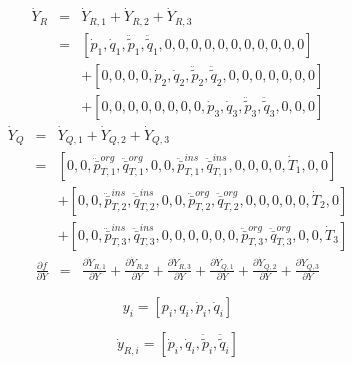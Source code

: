\documentclass[a4paper,10pt]{article}
\begin{document}
\begin{eqnarray*}
\dot{Y}_R & = & \dot{Y}_{R,1} + \dot{Y}_{R,2} + \dot{Y}_{R,3}\\
          & = & [   \dot{p}_1, \dot{q}_1, \ddot{\tilde{p}}_1, \ddot{\tilde{q}}_1, 0, 0, 0, 0, 0, 0, 0, 0, 0, 0, 0 ]\\
          &   & + [ 0, 0, 0, 0, \dot{p}_2, \dot{q}_2, \ddot{\tilde{p}}_2, \ddot{\tilde{q}}_2, 0, 0, 0, 0, 0, 0, 0 ]\\
          &   & + [ 0, 0, 0, 0, 0, 0, 0, 0, \dot{p}_3, \dot{q}_3, \ddot{\tilde{p}}_3, \ddot{\tilde{q}}_3, 0, 0, 0 ]
\end{eqnarray*}
\begin{eqnarray*}
\dot{Y}_Q & = & \dot{Y}_{Q,1} + \dot{Y}_{Q,2} + \dot{Y}_{Q,3}\\
          & = &   [ 0, 0, \ddot{\bar{p}}_{T,1}^{org}, \ddot{\bar{q}}_{T,1}^{org}, 0, 0, \ddot{\bar{p}}_{T,1}^{ins}, \ddot{\bar{q}}_{T,1}^{ins}, 0, 0, 0, 0, \dot{T}_1, 0, 0 ]\\
          &   & + [ 0, 0, \ddot{\bar{p}}_{T,2}^{ins}, \ddot{\bar{q}}_{T,2}^{ins}, 0, 0, \ddot{\bar{p}}_{T,2}^{org}, \ddot{\bar{q}}_{T,2}^{org}, 0, 0, 0, 0, 0, \dot{T}_2, 0 ]\\
          &   & + [ 0, 0, \ddot{\bar{p}}_{T,3}^{ins}, \ddot{\bar{q}}_{T,3}^{ins}, 0, 0, 0, 0, 0, 0, \ddot{\bar{p}}_{T,3}^{org}, \ddot{\bar{q}}_{T,3}^{org}, 0, 0, \dot{T}_3 ]
\end{eqnarray*}
\begin{eqnarray*}
\frac{\partial f}{\partial Y}
        & = & \frac{\partial\dot{Y}_{R,1}}{\partial Y} + \frac{\partial\dot{Y}_{R,2}}{\partial Y} + \frac{\partial\dot{Y}_{R,3}}{\partial Y}
              + \frac{\partial\dot{Y}_{Q,1}}{\partial Y} + \frac{\partial\dot{Y}_{Q,2}}{\partial Y} + \frac{\partial\dot{Y}_{Q,3}}{\partial Y}
\end{eqnarray*}


\begin{equation}
y_{i} = [p_i, q_i, \dot{p}_i, \dot{q}_i]
\end{equation}

\begin{equation}
\dot{y}_{R,i} = [\dot{p}_i, \dot{q}_i, \ddot{\tilde{p}}_i, \ddot{\tilde{q}}_i]
\end{equation}

\newcommand{\zm}[1]{\ensuremath{ {\color{opaqueblue} 0_{#1} } }}
\end{document}
